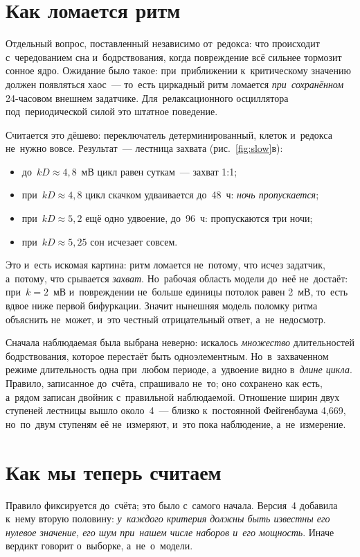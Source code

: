 \section{Как ломается ритм}\label{sec:bifur}
Отдельный вопрос, поставленный независимо от~редокса: что происходит с~чередованием сна и~бодрствования, когда повреждение всё сильнее тормозит сонное ядро. Ожидание было такое: при~приближении к~критическому значению должен появляться хаос~--- то~есть циркадный ритм ломается \emph{при~сохранённом} 24-часовом внешнем задатчике. Для~релаксационного осциллятора под~периодической силой это штатное поведение.

Считается это дёшево: переключатель детерминированный, клеток и~редокса не~нужно вовсе. Результат~--- лестница захвата (рис.~\ref{fig:slow}в):
\begin{itemize}
\item до~$kD\approx4{,}8$~мВ цикл равен суткам~--- захват 1:1;
\item при~$kD\approx4{,}8$ цикл скачком удваивается до~48~ч: \emph{ночь пропускается};
\item при~$kD\approx5{,}2$ ещё одно удвоение, до~96~ч: пропускаются три ночи;
\item при~$kD\approx5{,}25$ сон исчезает совсем.
\end{itemize}

Это и~есть искомая картина: ритм ломается не~потому, что исчез задатчик, а~потому, что срывается \emph{захват}. Но~рабочая область модели до~неё не~достаёт: при~$k=2$~мВ и~повреждении не~больше единицы потолок равен 2~мВ, то~есть вдвое ниже первой бифуркации. Значит нынешняя модель поломку ритма объяснить не~может, и~это честный отрицательный ответ, а~не~недосмотр.

\begin{note}
Сначала наблюдаемая была выбрана неверно: искалось \emph{множество} длительностей бодрствования, которое перестаёт быть одноэлементным. Но~в~захваченном режиме длительность одна при~любом периоде, а~удвоение видно в~\emph{длине цикла}. Правило, записанное до~счёта, спрашивало не~то; оно сохранено как есть, а~рядом записан двойник с~правильной наблюдаемой. Отношение ширин двух ступеней лестницы вышло около~4~--- близко к~постоянной Фейгенбаума 4,669, но~по~двум ступеням её не~измеряют, и~это пока наблюдение, а~не~измерение.
\end{note}

\section{Как мы теперь считаем}\label{sec:method}
Правило фиксируется до~счёта; это было с~самого начала. Версия~4 добавила к~нему вторую половину: \emph{у~каждого критерия должны быть известны его нулевое значение, его шум при~нашем числе наборов и~его мощность}. Иначе вердикт говорит о~выборке, а~не~о~модели.

